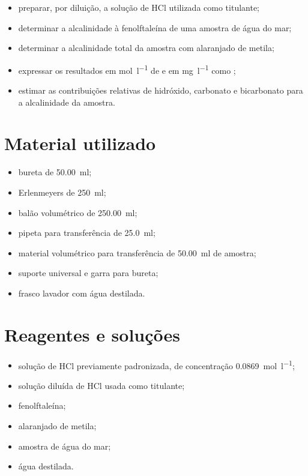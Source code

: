 \documentclass[a4paper,12pt]{article}
\newcommand{\ConcHClEstoque}{0.0869}
\begin{document}
\begin{itemize}
  \item preparar, por diluição, a solução de HCl utilizada como titulante;
  \item determinar a alcalinidade à fenolftaleína de uma amostra de água do mar;
  \item determinar a alcalinidade total da amostra com alaranjado de metila;
  \item expressar os resultados em \si{\mole\per\litre} de  e em
        \si{\milli\gram\per\litre} como ;
  \item estimar as contribuições relativas de hidróxido, carbonato e
        bicarbonato para a alcalinidade da amostra.
\end{itemize}

\section{Material utilizado}

\begin{itemize}
  \item bureta de \qty{50.00}{\milli\litre};
  \item Erlenmeyers de \qty{250}{\milli\litre};
  \item balão volumétrico de \qty{250.00}{\milli\litre};
  \item pipeta para transferência de \qty{25.0}{\milli\litre};
  \item material volumétrico para transferência de
        \qty{50.00}{\milli\litre} de amostra;
  \item suporte universal e garra para bureta;
  \item frasco lavador com água destilada.
\end{itemize}

\section{Reagentes e soluções}

\begin{itemize}
  \item solução de HCl previamente padronizada, de concentração
        \qty{\ConcHClEstoque}{\mole\per\litre};
  \item solução diluída de HCl usada como titulante;
  \item fenolftaleína;
  \item alaranjado de metila;
  \item amostra de água do mar;
  \item água destilada.
\end{itemize}
\end{document}
